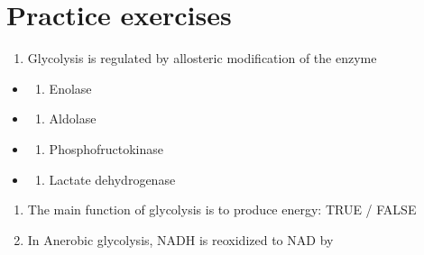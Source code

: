 \documentclass[
]{book}
\providecommand{\tightlist}{%
  \setlength{\itemsep}{0pt}\setlength{\parskip}{0pt}}
\begin{document}
\section{Practice exercises}\label{practice-exercises-1}

\begin{enumerate}
\def\labelenumi{\arabic{enumi}.}
\tightlist
\item
  Glycolysis is regulated by allosteric modification of the enzyme
\end{enumerate}

\begin{itemize}
\tightlist
\item
  \begin{enumerate}
  \def\labelenumi{(\Alph{enumi})}
  \tightlist
  \item
    Enolase\\
  \end{enumerate}
\item
  \begin{enumerate}
  \def\labelenumi{(\Alph{enumi})}
  \setcounter{enumi}{1}
  \tightlist
  \item
    Aldolase\\
  \end{enumerate}
\item
  \begin{enumerate}
  \def\labelenumi{(\Alph{enumi})}
  \setcounter{enumi}{2}
  \tightlist
  \item
    Phosphofructokinase\\
  \end{enumerate}
\item
  \begin{enumerate}
  \def\labelenumi{(\Alph{enumi})}
  \setcounter{enumi}{3}
  \tightlist
  \item
    Lactate dehydrogenase
  \end{enumerate}
\end{itemize}

\begin{enumerate}
\def\labelenumi{\arabic{enumi}.}
\setcounter{enumi}{1}
\item
  The main function of glycolysis is to produce energy: TRUE / FALSE
\item
  In Anerobic glycolysis, NADH is reoxidized to NAD by
\end{enumerate}
\end{document}
